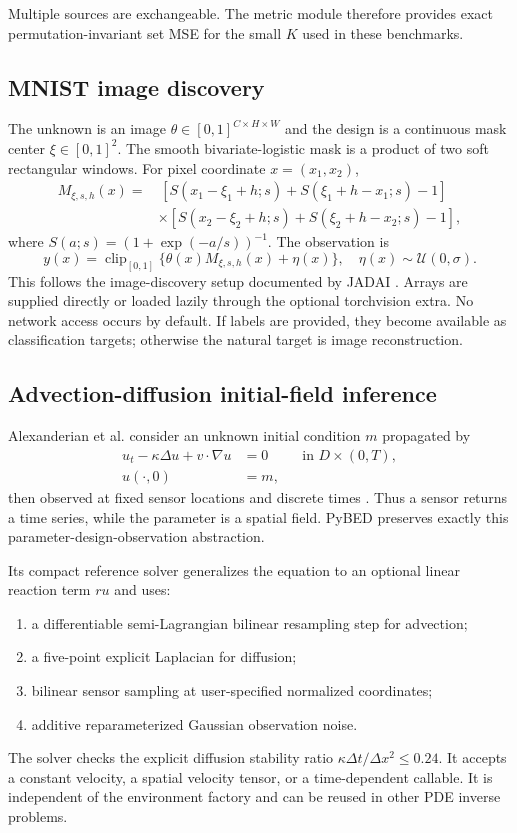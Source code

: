 \documentclass[11pt]{article}
\begin{document}
Multiple sources are exchangeable. The metric module therefore provides exact
permutation-invariant set MSE for the small $K$ used in these benchmarks.

\subsection{MNIST image discovery}

The unknown is an image $\theta\in[0,1]^{C\times H\times W}$ and the design is a
continuous mask center $\xi\in[0,1]^2$. The smooth bivariate-logistic mask is a
product of two soft rectangular windows. For pixel coordinate $x=(x_1,x_2)$,
\begin{align}
 M_{\xi,s,h}(x) = &\,[S(x_1-\xi_1+h;s)+S(\xi_1+h-x_1;s)-1] \\
 &\times[S(x_2-\xi_2+h;s)+S(\xi_2+h-x_2;s)-1],
\end{align}
where $S(a;s)=(1+\exp(-a/s))^{-1}$. The observation is
\begin{equation}
 y(x)=\operatorname{clip}_{[0,1]}\{\theta(x)M_{\xi,s,h}(x)+\eta(x)\},
 \quad \eta(x)\sim\mathcal{U}(0,\sigma).
\end{equation}
This follows the image-discovery setup documented by JADAI
\cite{bracher2025jadai}. Arrays are supplied directly or loaded lazily through the
optional torchvision extra. No network access occurs by default. If labels are
provided, they become available as classification targets; otherwise the natural
target is image reconstruction.

\subsection{Advection-diffusion initial-field inference}

Alexanderian et al. consider an unknown initial condition $m$ propagated by
\begin{align}
 u_t-\kappa\Delta u + v\cdot\nabla u &= 0
 &&\text{in } D\times(0,T),\\
 u(\cdot,0)&=m,
\end{align}
then observed at fixed sensor locations and discrete times
\cite{alexanderian2014}. Thus a sensor returns a time series, while the parameter is a
spatial field. PyBED preserves exactly this parameter-design-observation abstraction.

Its compact reference solver generalizes the equation to an optional linear reaction
term $ru$ and uses:
\begin{enumerate}
  \item a differentiable semi-Lagrangian bilinear resampling step for advection;
  \item a five-point explicit Laplacian for diffusion;
  \item bilinear sensor sampling at user-specified normalized coordinates;
  \item additive reparameterized Gaussian observation noise.
\end{enumerate}
The solver checks the explicit diffusion stability ratio
$\kappa\Delta t/\Delta x^2\leq 0.24$. It accepts a constant velocity, a spatial
velocity tensor, or a time-dependent callable. It is independent of the environment
factory and can be reused in other PDE inverse problems.
\end{document}

